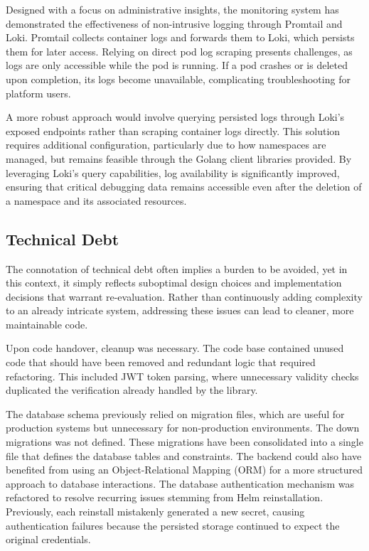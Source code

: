 Designed with a focus on administrative insights, the monitoring system has demonstrated the effectiveness of non-intrusive logging through Promtail and Loki. Promtail collects container logs and forwards them to Loki, which persists them for later access. Relying on direct pod log scraping presents challenges, as logs are only accessible while the pod is running. If a pod crashes or is deleted upon completion, its logs become unavailable, complicating troubleshooting for platform users.

A more robust approach would involve querying persisted logs through Loki's exposed endpoints rather than scraping container logs directly. This solution requires additional configuration, particularly due to how namespaces are managed, but remains feasible through the Golang client libraries provided. By leveraging Loki's query capabilities, log availability is significantly improved, ensuring that critical debugging data remains accessible even after the deletion of a namespace and its associated resources.

\subsection{Technical Debt}
The connotation of technical debt often implies a burden to be avoided, yet in this context, it simply reflects suboptimal design choices and implementation decisions that warrant re-evaluation. Rather than continuously adding complexity to an already intricate system, addressing these issues can lead to cleaner, more maintainable code.

Upon code handover, cleanup was necessary. The code base contained unused code that should have been removed and redundant logic that required refactoring. This included JWT token parsing, where unnecessary validity checks duplicated the verification already handled by the library.

The database schema previously relied on migration files, which are useful for production systems but unnecessary for non-production environments. The down migrations was not defined. These migrations have been consolidated into a single file that defines the database tables and constraints. The backend could also have benefited from using an Object-Relational Mapping (ORM) for a more structured approach to database interactions. The database authentication mechanism was refactored to resolve recurring issues stemming from Helm reinstallation. Previously, each reinstall mistakenly generated a new secret, causing authentication failures because the persisted storage continued to expect the original credentials.

